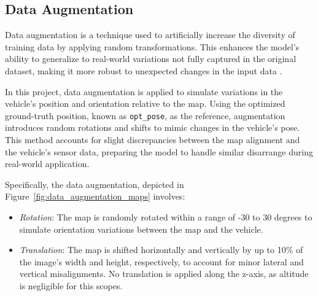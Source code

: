 \subsection{Data Augmentation} 

Data augmentation is a technique used to artificially increase the diversity of training data by applying random transformations. This enhances the model’s ability to generalize to real-world variations not fully captured in the original dataset, making it more robust to unexpected changes in the input data \cite{MUMUNI2022100258}.

In this project, data augmentation is applied to simulate variations in the vehicle's position and orientation relative to the map. Using the optimized ground-truth position, known as \texttt{opt\_pose}, as the reference, augmentation introduces random rotations and shifts to mimic changes in the vehicle’s pose. This method accounts for slight discrepancies between the map alignment and the vehicle’s sensor data, preparing the model to handle similar disarrange during real-world application.

Specifically, the data augmentation, depicted in Figure~\ref{fig:data_augmentation_maps} involves:
\begin{itemize}
    \item \textit{Rotation}: The map is randomly rotated within a range of -$30$ to $30$ degrees to simulate orientation variations between the map and the vehicle.
    \item \textit{Translation}: The map is shifted horizontally and vertically by up to 10\% of the image’s width and height, respectively, to account for minor lateral and vertical misalignments. No translation is applied along the z-axis, as altitude is negligible for this scopes.

\end{itemize}

